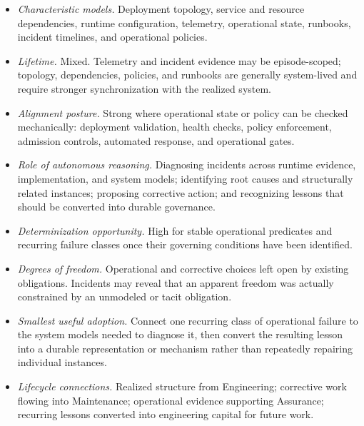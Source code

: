 \begin{itemize}
\tightlist
\item
  \emph{Characteristic models.} Deployment topology, service and resource dependencies, runtime configuration, telemetry, operational state, runbooks, incident timelines, and operational policies.
\item
  \emph{Lifetime.} Mixed. Telemetry and incident evidence may be episode-scoped; topology, dependencies, policies, and runbooks are generally system-lived and require stronger synchronization with the realized system.
\item
  \emph{Alignment posture.} Strong where operational state or policy can be checked mechanically: deployment validation, health checks, policy enforcement, admission controls, automated response, and operational gates.
\item
  \emph{Role of autonomous reasoning.} Diagnosing incidents across runtime evidence, implementation, and system models; identifying root causes and structurally related instances; proposing corrective action; and recognizing lessons that should be converted into durable governance.
\item
  \emph{Determinization opportunity.} High for stable operational predicates and recurring failure classes once their governing conditions have been identified.
\item
  \emph{Degrees of freedom.} Operational and corrective choices left open by existing obligations. Incidents may reveal that an apparent freedom was actually constrained by an unmodeled or tacit obligation.
\item
  \emph{Smallest useful adoption.} Connect one recurring class of operational failure to the system models needed to diagnose it, then convert the resulting lesson into a durable representation or mechanism rather than repeatedly repairing individual instances.
\item
  \emph{Lifecycle connections.} Realized structure from Engineering; corrective work flowing into Maintenance; operational evidence supporting Assurance; recurring lessons converted into engineering capital for future work.
\end{itemize}
